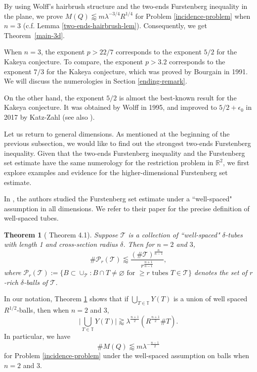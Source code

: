 \documentclass{amsart}
\numberwithin{equation}{section}
\newtheorem{theorem}{Theorem}[section]
\newcommand{\de}{\delta}
\newcommand{\la}{\lambda}
\newcommand{\cp}{\mathcal P}
\newcommand{\ZR}{\mathbb{R}}
\newcommand{\ZT}{\mathbb{T}}
\newcommand{\cT}{{\mathcal T}}
\begin{document}
By using Wolff's hairbrush structure and the two-ends Furstenberg inequality in the plane, we prove $M(Q)\lessapprox m\la^{-3/4}R^{1/4}$ for Problem \ref{incidence-problem} when $n=3$ (c.f. Lemma \ref{two-ends-hairbrush-lem}). Consequently, we get Theorem~\ref{main-3d}.

\smallskip

When $n=3$, the exponent $p>22/7$ corresponds to the exponent $5/2$ for the Kakeya conjecture. 
To compare, the exponent $p>3.2$ corresponds to the exponent $7/3$ for the Kakeya conjecture, which was proved by Bourgain \cite{Bourgain-Besicovitch} in 1991. We will discuss the numerologies in Section \ref{ending-remark}.

On the other hand, the exponent $5/2$ is almost the best-known result for the Kakeya conjecture. 
It was obtained by Wolff \cite{Wolff-Kakeya} in 1995, and improved to $5/2+\epsilon_0$ in 2017 by Katz-Zahl \cite{Katz-Zahl-1} (see also \cite{Wu-regulus-strip}).


\medskip

Let us return to general dimensions. 
As mentioned at the beginning of the previous subsection, we would like to find out the strongest two-ends Furstenberg inequality. 
Given that the two-ends Furstenberg inequality and the Furstenberg set estimate have the same numerology for the restriction problem in $\ZR^2$, we first explore examples and evidence for the higher-dimensional Furstenberg set estimate.

In \cite{GSW-19}, the authors studied the Furstenberg set estimate under a ``well-spaced" assumption in all dimensions. We refer to their paper for the precise definition of well-spaced tubes.

\begin{theorem}[\cite{GSW-19} Theorem 4.1]
\label{well-spaced-thm}
Suppose $\cT$ is a collection of ``well-spaced" $\de$-tubes with length 1 and cross-section radius $\de$.
Then for $n=2$ and $3$,
\begin{equation}
\label{well-spaced-esti}
    \#\cp_r(\cT)\lessapprox\frac{(\#\cT)^\frac{n}{n-1}}{r^\frac{n+1}{n-1}},
\end{equation}
where $\cp_r(\cT):=\{B\subset\cup_\cT:B\cap T\not=\varnothing\text{ for $\geq r$ tubes $T\in\cT$}\}$ denotes the set of $r$-rich $\de$-balls of $\cT$.
\end{theorem}


In our notation, Theorem \ref{well-spaced-thm} shows that if $\bigcup_{T\in \ZT}Y(T)$ is a union of well spaced $R^{1/2}$-balls, then when $n=2$ and $3$,
\begin{equation}
    \big|\bigcup_{T\in \ZT}Y(T)\big|\gtrapprox \la^{\frac{n+1}{2}}(R^{\frac{n+1}{2}}\#T).
\end{equation}
In particular, we have
\begin{equation}
\label{multi-bound-2}
    \#M(Q)\lessapprox m\la^{-\frac{n-1}{2}}
\end{equation}
for Problem \ref{incidence-problem} under the well-spaced assumption on balls when $n=2$ and $3$. 
\end{document}
